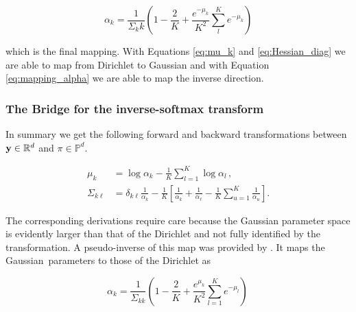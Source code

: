 \begin{equation}
\label{eq:mapping_alpha}
\alpha_k = \frac{1}{\Sigma_kk} \left(1 - \frac{2}{K} + \frac{e^{-\mu_k}}{K^2} \sum_l^K e^{-\mu_k} \right)
\end{equation}

which is the final mapping. With Equations \ref{eq:mu_k} and \ref{eq:Hessian_diag} we are able to map from Dirichlet to Gaussian and with Equation \ref{eq:mapping_alpha} we are able to map the inverse direction. 

\subsubsection{The Bridge for the inverse-softmax transform}

In summary we get the following forward and backward transformations between $\mathbf{y} \in \mathbb{R}^d$ and $\pi \in \mathbb{P}^d$.

\begin{align}
	\mu_k &= \log \alpha_k  - \frac{1}{K} \sum_{l=1}^{K} \log \alpha_l \, , \label{eq:mubridge}\\
	\Sigma_{k\ell} &= \delta_{k\ell}\frac{1}{\alpha_k} - \frac{1}{K}\left[\frac{1}{\alpha_k} + \frac{1}{\alpha_\ell} - \frac{1}{K}\sum_{u=1} ^K \frac{1}{\alpha_u} \right].
	\label{eq:Sigmabridge} 
\end{align}

The corresponding derivations require care because the Gaussian parameter space is evidently larger than that of the Dirichlet and not fully identified by the transformation.
A pseudo-inverse of this map was provided by \citet{KernelTopicModels2012}. It maps the Gaussian parameters to those of the Dirichlet as

\begin{equation} \label{eq:alpha_transform}
	\alpha_k = \frac{1}{\Sigma_{kk}}\left(1 - \frac{2}{K} + \frac{e^{\mu_k}}{K^2}\sum_{l=1}^K e^{-\mu_l} \right) \,
\end{equation}